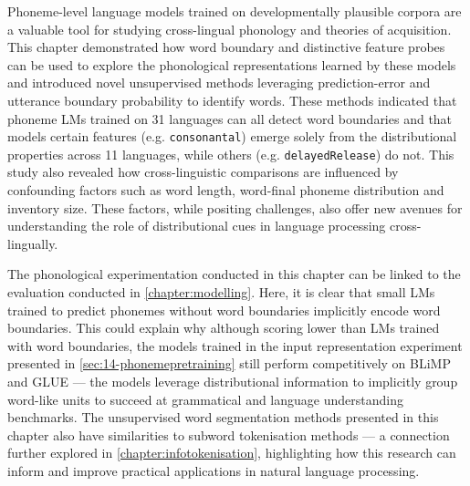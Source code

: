 Phoneme-level language models trained on developmentally plausible corpora are a valuable tool for studying cross-lingual phonology and theories of acquisition. This chapter demonstrated how word boundary and distinctive feature probes can be used to explore the phonological representations learned by these models and introduced novel unsupervised methods leveraging prediction-error and utterance boundary probability to identify words. These methods indicated that phoneme LMs trained on 31 languages can all detect word boundaries and that models certain features (e.g. \texttt{consonantal}) emerge solely from the distributional properties across 11 languages, while others (e.g. \texttt{delayedRelease}) do not. This study also revealed how cross-linguistic comparisons are influenced by confounding factors such as word length, word-final phoneme distribution and inventory size. These factors, while positing challenges, also offer new avenues for understanding the role of distributional cues in language processing cross-lingually.

The phonological experimentation conducted in this chapter can be linked to the evaluation conducted in \cref{chapter:modelling}. Here, it is clear that small LMs trained to predict phonemes without word boundaries implicitly encode word boundaries. This could explain why although scoring lower than LMs trained with word boundaries, the models trained in the input representation experiment presented in \cref{sec:14-phonemepretraining} still perform competitively on BLiMP and GLUE --- the models leverage distributional information to implicitly group word-like units to succeed at grammatical and language understanding benchmarks. The unsupervised word segmentation methods presented in this chapter also have similarities to subword tokenisation methods --- a connection further explored in \cref{chapter:infotokenisation}, highlighting how this research can inform and improve practical applications in natural language processing.




